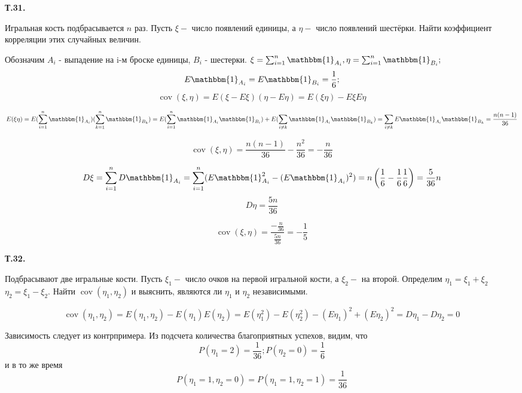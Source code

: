 \documentclass[a4paper,12pt]{article} %
\begin{document}
\begin{example} \textbf{Т.31.} 


Игральная кость подбрасывается $n$ раз.
Пусть $\xi-$ число появлений единицы, а $\eta-$ число появлений шестёрки. 
Найти коэффициент корреляции этих случайных величин.


Обозначим $ A_i$ - выпадение на i-м броске единицы, $B_i$ - шестерки.
$ \xi =\sum_{i=1}^{n} \mathbbm{1}_{A_i},  \eta = \sum_{i=1}^{n} \mathbbm{1}_{B_i}; $
\[ E \mathbbm{1}_{A_i}= E  \mathbbm{1}_{B_i}=\frac{1}{6} ;  \]
%
\[ \operatorname{cov} (\xi, \eta) =
E(\xi-E\xi) (\eta- E\eta)= E(\xi\eta)-E\xi E\eta\]

\[ E(\xi\eta)=E(\sum_{i=1}^{n}\mathbbm{1}_{A_i}) (\sum_{k=1}^{n}\mathbbm{1}_{B_k})= E(\sum_{i=1}^{n}\mathbbm{1}_{A_i}\mathbbm{1}_{B_i})+E(\sum_{i\ne k} \mathbbm{1}_{A_i} \mathbbm{1}_{B_k}) =\sum_{i\ne k} E \mathbbm{1}_{A_i} \mathbbm{1}_{B_k}=\frac{n(n-1)}{36} \]

\[ \operatorname{cov}(\xi,\eta)=
\frac{n(n-1)}{36}-\frac{n^2}{36}=-\frac{n}{36}  \]


\[ D\xi =\sum_{i=1}^{n} D \mathbbm{1}_{A_i} = \sum_{i=1}^{n}(E \mathbbm{1}_{A_i}^2- (E\mathbbm{1}_{A_i})^2 ) =
n\left(\frac{1}{6}-\frac{1}{6}\frac{1}{6}\right) = \frac{5}{36}n\]
\[ D \eta =\frac{5n}{36} \]

\[ \operatorname{cov}(\xi,\eta)=\dfrac{-\frac{n}{36}}{\frac{5n}{36}}=-\frac{1}{5} \]


\end{example}



\begin{example} \textbf{Т.32.} 

Подбрасывают две игральные кости. 
Пусть $\xi_{1}-$ число очков на первой игральной кости, а $\xi_{2}-$ на второй. 
Определим $\eta_{1}=\xi_{1}+\xi_{2}$ $\eta_{2}=\xi_{1}-\xi_{2} .$ 
Найти $\operatorname{cov}\left(\eta_{1},\eta_{2}\right)$ и выяснить, являются ли $\eta_{1}$ и $\eta_{2}$ независимыми.



\[ \operatorname{cov}(\eta_{1},\eta_{2})=
E(\eta_{1},\eta_{2})-E(\eta_{1}) E(\eta_{2}) =
E(\eta_{1}^2)- E(\eta_{2}^2)-(E\eta_{1})^2
+(E\eta_{2})^2= D\eta_{1} - D \eta_{2}= 0\]

Зависимость следует из контрпримера.
Из подсчета количества благоприятных успехов, видим, что
\[ P(\eta_1=2)=\frac{1}{36}; P(\eta_2 =0) = \frac{1}{6} \]
и в то же время
\[ P(\eta_{1}=1, \eta_{2}=0)=P (\eta_{1}=1, \eta_{2}=1)= \frac{1}{36} \]


\end{example}
\end{document}
